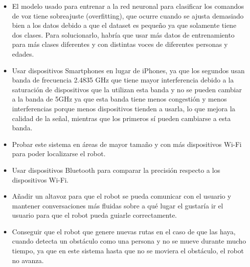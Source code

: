 \begin{itemize}

 \item \textit{} El modelo usado para entrenar a la red neuronal para clasificar los comandos de voz tiene sobreajuste (overfitting), que ocurre cuando se ajusta demasiado bien a los datos debido a que el dataset es pequeño ya que solamente tiene dos clases. Para solucionarlo, habría que usar más datos de entrenamiento para más clases diferentes y con distintas voces de diferentes personas y edades.
 
 \item \textit{} Usar dispositivos Smartphones en lugar de iPhones, ya que los segundos usan banda de frecuencia 2.4835 GHz que tiene mayor interferencia debido a la saturación de dispositivos que la utilizan esta banda y no se pueden cambiar a la banda de 5GHz ya que esta banda tiene menos congestión y menos interferencias porque menos dispositivos tienden a usarla, lo que mejora la calidad de la señal, mientras que los primeros sí pueden cambiarse a esta banda.
 \item \textit{} Probar este sistema en áreas de mayor tamaño y con más dispositivos Wi-Fi para poder localizarse el robot.
  \item \textit{} Usar dispositivos Bluetooth para comparar la precisión respecto a los dispositivos Wi-Fi.
  \item \textit{} Añadir un altavoz para que el robot se pueda comunicar con el usuario y mantener conversaciones más fluidas sobre a qué lugar el gustaría ir el usuario para que el robot pueda guiarle correctamente.
 \item \textit{} Conseguir que el robot que genere nuevas rutas en el caso de que las haya, cuando detecta un obstáculo como una persona y no se mueve durante mucho tiempo, ya que en este sistema hasta que no se moviera el obstáculo, el robot no avanza.
\end{itemize}\




